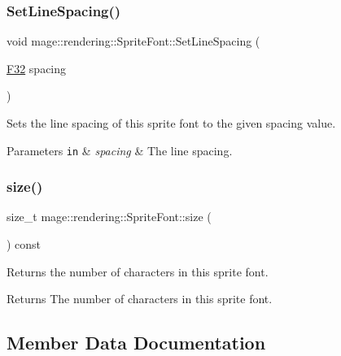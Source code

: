 \subsubsection{\texorpdfstring{Set\+Line\+Spacing()}{SetLineSpacing()}}
{\footnotesize\ttfamily void mage\+::rendering\+::\+Sprite\+Font\+::\+Set\+Line\+Spacing (\begin{DoxyParamCaption}\item[{\hyperlink{namespacemage_aa97e833b45f06d60a0a9c4fc22ae02c0}{F32}}]{spacing }\end{DoxyParamCaption})\hspace{0.3cm}{\ttfamily [noexcept]}}

Sets the line spacing of this sprite font to the given spacing value.


\begin{DoxyParams}[1]{Parameters}
\mbox{\tt in}  & {\em spacing} & The line spacing. \\
\hline
\end{DoxyParams}
\hypertarget{classmage_1_1rendering_1_1_sprite_font_a4f5191f82d228c41b5b6b1ca8215a4b2}{}\label{classmage_1_1rendering_1_1_sprite_font_a4f5191f82d228c41b5b6b1ca8215a4b2} 
\subsubsection{\texorpdfstring{size()}{size()}}
{\footnotesize\ttfamily size\+\_\+t mage\+::rendering\+::\+Sprite\+Font\+::size (\begin{DoxyParamCaption}{ }\end{DoxyParamCaption}) const\hspace{0.3cm}{\ttfamily [noexcept]}}

Returns the number of characters in this sprite font.

\begin{DoxyReturn}{Returns}
The number of characters in this sprite font. 
\end{DoxyReturn}


\subsection{Member Data Documentation}
\hypertarget{classmage_1_1rendering_1_1_sprite_font_a0d60c46888b2b2a2c1787dcf6f0e041b}{}\label{classmage_1_1rendering_1_1_sprite_font_a0d60c46888b2b2a2c1787dcf6f0e041b} 
